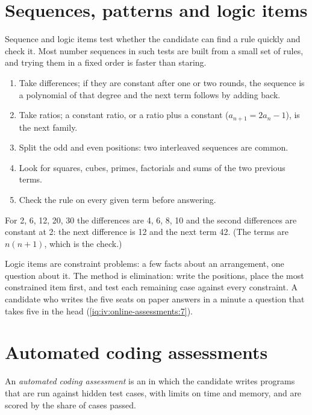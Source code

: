 \section{Sequences, patterns and logic items}

Sequence and logic items test whether the candidate can find a rule quickly and check it. Most number
sequences in such tests are built from a small set of rules, and trying them in a fixed order is faster than
staring.

\begin{method}\label{met:iv:online-assessments:sequence}
\begin{enumerate}
\item Take differences; if they are constant after one or two rounds, the sequence is a polynomial of that
degree and the next term follows by adding back.
\item Take ratios; a constant ratio, or a ratio plus a constant ($a_{n+1} = 2a_n - 1$), is the next family.
\item Split the odd and even positions: two interleaved sequences are common.
\item Look for squares, cubes, primes, factorials and sums of the two previous terms.
\item Check the rule on every given term before answering.
\end{enumerate}
\end{method}

\begin{example}[Differences]\label{ex:iv:online-assessments:diff}
For 2, 6, 12, 20, 30 the differences are 4, 6, 8, 10 and the second differences are constant at 2: the next
difference is 12 and the next term 42. (The terms are $n(n+1)$, which is the check.)
\end{example}

Logic items are constraint problems: a few facts about an arrangement, one question about it. The method is
elimination: write the positions, place the most constrained item first, and test each remaining case against
every constraint. A candidate who writes the five seats on paper answers in a minute a question that takes
five in the head (\cref{iq:iv:online-assessments:7}).

\section{Automated coding assessments}

\begin{definition}\label{def:iv:online-assessments:coding}
An \emph{automated coding assessment} is an  in which the
candidate writes programs that are run against hidden test cases, with limits on time and memory, and are
scored by the share of cases passed.
\end{definition}

